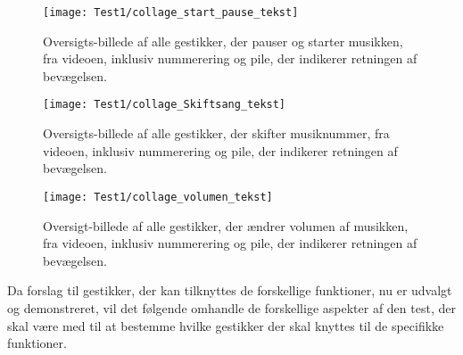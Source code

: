 %
\begin{figure}[H]
	\centering
	\texttt{[image: Test1/collage\_start\_pause\_tekst]}
	\caption{Oversigts-billede af alle gestikker, der pauser og starter musikken, fra videoen, inklusiv nummerering og pile, der indikerer retningen af bevægelsen.}
	\label{fig:OversigtPauseStart}
\end{figure}
\noindent
%
%
\begin{figure}[H]
	\centering
	\texttt{[image: Test1/collage\_Skiftsang\_tekst]}
	\caption{Oversigts-billede af alle gestikker, der skifter musiknummer, fra videoen, inklusiv nummerering og pile, der indikerer retningen af bevægelsen.}
	\label{fig:OversigtSkift}
\end{figure}
\noindent
%
%
\begin{figure}[H]
	\centering
	\texttt{[image: Test1/collage\_volumen\_tekst]}
	\caption{Oversigt-billede af alle gestikker, der ændrer volumen af musikken, fra videoen, inklusiv nummerering og pile, der indikerer retningen af bevægelsen.}
	\label{fig:OversigtVolumen}
\end{figure}
\noindent
%
Da forslag til gestikker, der kan tilknyttes de forskellige funktioner, nu er udvalgt og demonstreret, vil det følgende omhandle de forskellige aspekter af den test, der skal være med til at bestemme hvilke gestikker der skal knyttes til de specifikke funktioner.